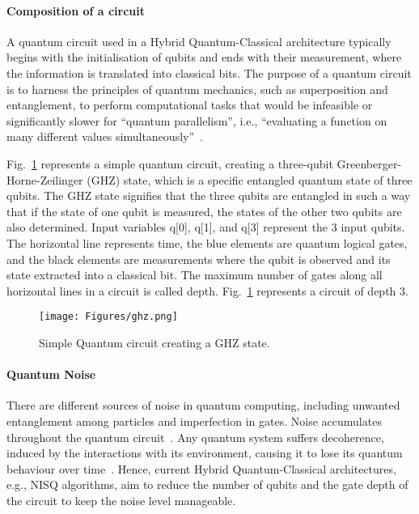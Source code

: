 \paragraph{Composition of a circuit}
A quantum circuit used in a Hybrid Quantum-Classical architecture typically begins with the initialisation of qubits and ends with their measurement, where the information is translated into classical bits. The purpose of a quantum circuit is to harness the principles of quantum mechanics, such as superposition and entanglement, to perform computational tasks that would be infeasible or significantly slower for ``quantum parallelism'', i.e., ``evaluating a function on many different values simultaneously''~\cite{nielsenChuang10}.

Fig.~\ref{ghz} represents a simple quantum circuit, creating a three-qubit Greenberger-Horne-Zeilinger (GHZ) state, which is a specific entangled quantum state of three qubits. The GHZ state signifies that the three qubits are entangled in such a way that if the state of one qubit is measured, the states of the other two qubits are also determined. Input variables q[0], q[1], and q[3] represent the 3 input qubits. The horizontal line represents time, the blue elements are quantum logical gates, and the black elements are measurements where the qubit is observed and its state extracted into a classical bit. The maximum number of gates along all horizontal lines in a circuit is called depth. Fig.~\ref{ghz} represents a circuit of depth 3. \\

\begin{figure}[hbt!]
\texttt{[image: Figures/ghz.png]}
\caption{Simple Quantum circuit creating a GHZ state.}
\label{ghz}
\end{figure}

\paragraph{Quantum Noise}
There are different sources of noise in quantum computing, including unwanted entanglement among particles and imperfection in gates. 
Noise accumulates throughout the quantum circuit~\cite{clerk_introduction_2010}. Any quantum system suffers decoherence, induced by the interactions with its environment, causing it to lose its quantum behaviour over time~\cite{lau_nisq_2022}. Hence, current Hybrid Quantum-Classical architectures, e.g., NISQ algorithms, aim to reduce the number of qubits and the gate depth of the circuit to keep the noise level manageable. \\

